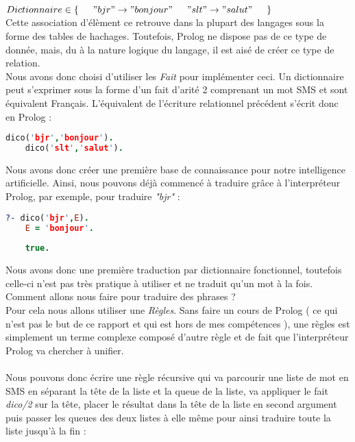 \documentclass[11pt]{book}
\begin{document}
		$ 
			Dictionnaire \in \{ \\
			\indent	"bjr" \rightarrow "bonjour"\\
			\indent "slt" \rightarrow "salut"\\
			\indent \}
		$\\
	
	\noindent Cette association d'élèment ce retrouve dans la plupart des langages sous la forme des tables de hachages. Toutefois, Prolog ne dispose pas de ce type de donnée, mais, du à la nature logique du langage, il est aisé de créer ce type de relation.\\
	Nous avons donc choisi d'utiliser les \emph{Fait} pour implémenter ceci. Un dictionnaire peut s'exprimer sous la forme d'un fait d'arité 2 comprenant un mot SMS et sont équivalent Français. L'équivalent de l'écriture relationnel précédent s'écrit donc en Prolog :\\
	
	\begin{lstlisting}[language=Prolog]
	dico('bjr','bonjour').
	dico('slt','salut').
	\end{lstlisting}
	
	Nous avons donc créer une première base de connaissance pour notre intelligence artificielle. Ainsi, nous pouvons déjà commencé à traduire grâce à l’interpréteur Prolog, par exemple, pour traduire {\em "bjr"} :
	\begin{lstlisting}[language=Prolog]
	?- dico('bjr',E).
	E = 'bonjour'.
	
	true.
	\end{lstlisting}
	
	Nous avons donc une première traduction par dictionnaire fonctionnel, toutefois celle-ci n'est pas très pratique à utiliser et ne traduit qu'un mot à la fois. Comment allons nous faire pour traduire des phrases ?\\
	Pour cela nous allons utiliser une {\em Règles}. Sans faire un cours de Prolog ( ce qui n'est pas le but de ce rapport et qui est hors de mes compétences ), une règles est simplement un terme complexe composé d'autre règle et de fait que l’interpréteur Prolog va chercher à unifier.
	\paragraph{}
	Nous pouvons donc écrire une règle récursive qui va parcourir une liste de mot en SMS en séparant la tête de la liste et la queue de la liste, va appliquer le fait {\em dico/2} sur la tête, placer le résultat dans la tête de la liste en second argument puis passer les queues des deux listes à elle même pour ainsi traduire toute la liste jusqu'à la fin :
	
\end{document}
